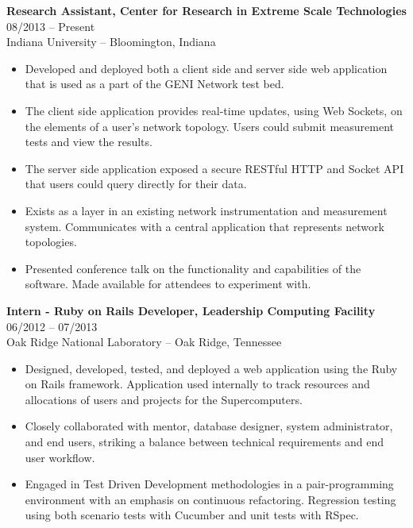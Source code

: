 \documentclass[12pt,letterpaper]{article}
\begin{document}
\textbf{Research Assistant, Center for Research in Extreme Scale Technologies}
\hfill{08/2013 -- Present} \\
Indiana University -- Bloomington, Indiana

\begin{itemize}

  \item Developed and deployed both a client side and server side web
  application that is used as a part of the GENI Network test bed.

  \item The client side application provides real-time updates, using Web Sockets,
  on the elements of a user's network topology. Users could submit measurement
  tests and view the results.

  \item The server side application exposed a secure RESTful HTTP and
  Socket API that users could query directly for their data.

  \item Exists as a layer in an existing network instrumentation and
  measurement system. Communicates with a central application that represents
  network topologies.

  \item Presented conference talk on the functionality and capabilities of the software.
  Made available for attendees to experiment with.

\end{itemize}


\noindent\textbf{Intern - Ruby on Rails Developer, Leadership Computing Facility}
\hfill{06/2012 -- 07/2013} \\
Oak Ridge National Laboratory -- Oak Ridge, Tennessee

\begin{itemize}

	\item Designed, developed, tested, and deployed a web application using the Ruby
  on Rails framework. Application used internally to track resources and allocations
  of users and projects for the Supercomputers.

  \item Closely collaborated with mentor, database designer, system administrator, and end users, striking a balance between technical requirements and end user workflow.

  \item Engaged in Test Driven Development methodologies in a pair-programming environment
  with an emphasis on continuous refactoring.
  Regression testing using both scenario tests with Cucumber and unit tests with RSpec.

\end{itemize}
\end{document}
